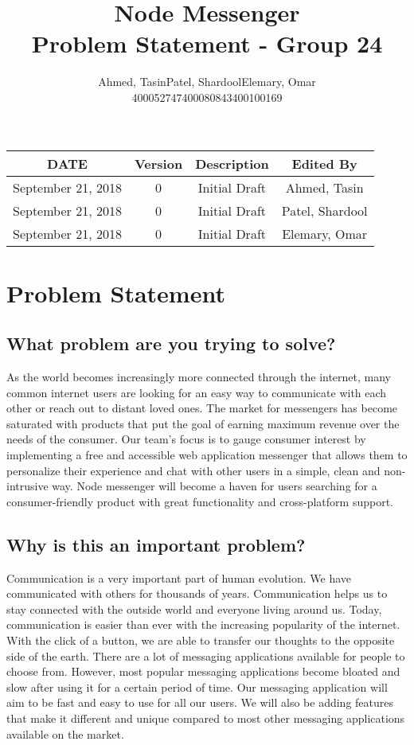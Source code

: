 \documentclass{article}
\title{\Huge\textbf{Node Messenger}\\
		\huge{Problem Statement - Group 24}}
\author{Ahmed, Tasin\hspace{1cm}Patel, Shardool\hspace{1cm}Elemary, Omar \\
		400052747\hspace{2cm}400080843\hspace{2cm}400100169}
\begin{document}
\maketitle
  	
\begin{table}[hp]
\begin{center}
\label{tab:}
\begin{tabular}{|c|c|c|c|}
\hline
\textbf{DATE} & \textbf{Version} & \textbf{Description} & \textbf{Edited By}\\
\hline
September 21, 2018 & 0 & Initial Draft & Ahmed, Tasin\\
\hline
September 21, 2018 & 0 & Initial Draft & Patel, Shardool\\
\hline
September 21, 2018 & 0 & Initial Draft & Elemary, Omar\\
\hline
\end{tabular}
\end{center}
\label{default}
\end{table}
	\newpage
	\newpage
	\section{Problem Statement}
	\subsection{What problem are you trying to solve?}
    As the world becomes increasingly more connected through the internet, many common internet users are looking for an easy way to communicate with each other or reach out to distant loved ones. The market for messengers has become saturated with products that put the goal of earning maximum revenue over the needs of the consumer. Our team’s focus is to gauge consumer interest by implementing a free and accessible web application messenger that allows them to personalize their experience and chat with other users in a simple, clean and non-intrusive way. Node messenger will become a haven for users searching for a consumer-friendly product with great functionality and cross-platform support.
	\subsection{Why is this an important problem?}
    Communication is a very important part of human evolution. We have communicated with others for thousands of years. Communication helps us to stay connected with the outside world and everyone living around us. Today, communication is easier than ever with the increasing popularity of the internet. With the click of a button, we are able to transfer our thoughts to the opposite side of the earth. There are a lot of messaging applications available for people to choose from. However, most popular messaging applications become bloated and slow after using it for a certain period of time. Our messaging application will aim to be fast and easy to use for all our users. We will also be adding features that make it different and unique compared to most other messaging applications available on the market.  
\end{document}
